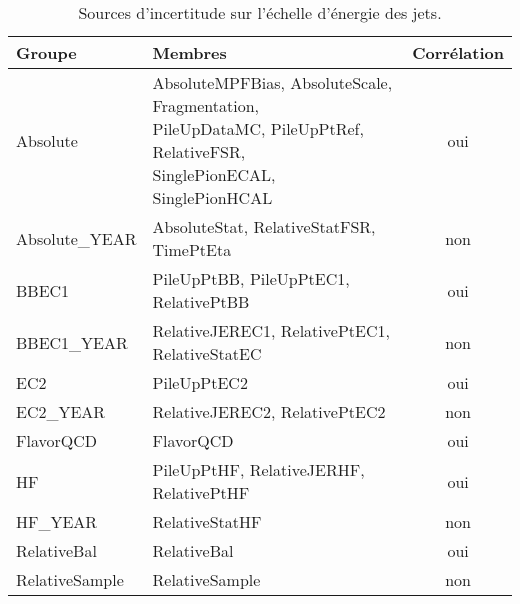 \begin{table}[!ht]
\begin{tabular}{|l|l|c|}
\hline
Groupe         & Membres                                                                                                              & Corrélation \\ \hline \hline
\shortstack{ ~ \\ Absolute \\ ~}  & \shortstack{AbsoluteMPFBias, AbsoluteScale, Fragmentation, \\ PileUpDataMC, PileUpPtRef, RelativeFSR, \\ SinglePionECAL, SinglePionHCAL}   & \shortstack{ ~ \\ oui \\ ~ }         \\ \hline

Absolute\_YEAR & AbsoluteStat, RelativeStatFSR, TimePtEta                                                                             & non         \\ \hline
BBEC1          & PileUpPtBB, PileUpPtEC1, RelativePtBB                                                                                & oui         \\ \hline
BBEC1\_YEAR    & RelativeJEREC1, RelativePtEC1, RelativeStatEC                                                                        & non         \\ \hline
EC2            & PileUpPtEC2                                                                                                          & oui         \\ \hline
EC2\_YEAR      & RelativeJEREC2, RelativePtEC2                                                                                        & non         \\ \hline
FlavorQCD      & FlavorQCD                                                                                                            & oui         \\ \hline
HF             & PileUpPtHF, RelativeJERHF, RelativePtHF                                                                              & oui         \\ \hline
HF\_YEAR       & RelativeStatHF                                                                                                       & non         \\ \hline
RelativeBal    & RelativeBal                                                                                                          & oui         \\ \hline
RelativeSample & RelativeSample                                                                                                       & non         \\ \hline \hline
\end{tabular}
\caption{Sources d'incertitude sur l'échelle d'énergie des jets.}
\label{JES}
\end{table}